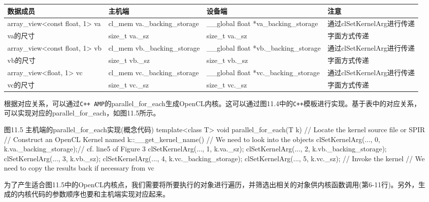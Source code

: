 \par\medskip\noindent
\begingroup\fontsize{9bp}{12.5bp}\selectfont\renewcommand{\arraystretch}{1.12}
\begin{center}
\begin{tabularx}{\textwidth}{XXXX}
\toprule
数据成员 & 主机端 & 设备端 & 注意 \\
\midrule
array\_view\textless{}const float, 1\textgreater{} va & cl\_mem va.\_backing\_storage & \_\_global float *va\_backing\_storage & 通过clSetKernelArg进行传递 \\
va的尺寸 & size\_t va.\_sz & size\_t va.\_sz & 字面方式传递 \\
array\_view\textless{}const float, 1\textgreater{} vb & cl\_mem vb.\_backing\_storage & \_\_global float *vb.\_backing\_storage & 通过clSetKernelArg进行传递 \\
vb的尺寸 & size\_t vb.\_sz & size\_t vb.\_sz & 字面方式传递 \\
array\_view\textless{}float, 1\textgreater{} vc & cl\_mem vc.\_backing\_storage & \_\_global float *vc.\_backing\_storage & 通过clSetKernelArg进行传递 \\
vc的尺寸 & size\_t vc.\_sz & size\_t vc.\_sz & 字面方式传递 \\
\bottomrule
\end{tabularx}
\end{center}
\endgroup
\medskip

根据对应关系，可以通过\texttt{C++ AMP}的parallel\_\allowbreak{}for\_\allowbreak{}each生成OpenCL内核。这可以通过图11.4中的\texttt{C++}模板进行实现。基于表中的对应关系，可以实现对应的parallel\_\allowbreak{}for\_\allowbreak{}each，如图11.5所示。

\begin{codeboxt}[cpp]{图11.5 主机端的parallel\_for\_each实现(概念代码)}
template<class T>
void parallel_for_each(T k){
  // Locate the kernel source file or SPIR
  // Construct an OpenCL Kernel named k::__get_kernel_name()
  // We need to look into the objects
  clSetKernelArg(..., 0, k.va._backing_storage);// cf. line5 of Figure 3
  clSetKernelArg(..., 1, k.va._sz);
  clSetKernelArg(..., 2, k.vb._backing_storage);
  clSetKernelArg(..., 3, k.vb._sz);
  clSetKernelArg(..., 4, k.vc._backing_storage);
  clSetKernelArg(..., 5, k.vc._sz);
  // Invoke the kernel
  // We need to copy the results back if necessary from vc
}
\end{codeboxt}

为了产生适合图11.5中的OpenCL内核点，我们需要将所要执行的对象进行遍历，并筛选出相关的对象供内核函数调用(第6-11行)。另外，生成的内核代码的参数顺序也要和主机端实现对应起来。

